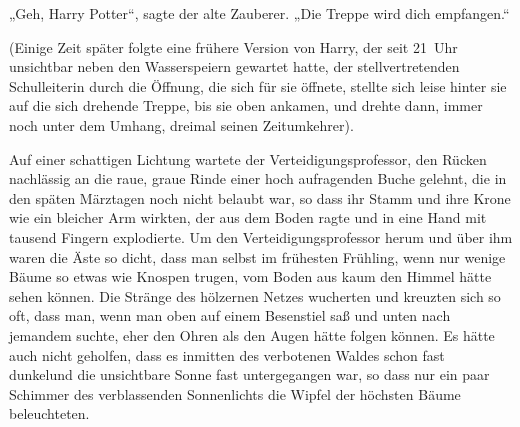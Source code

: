 „Geh, Harry Potter“, sagte der alte Zauberer. „Die Treppe wird dich empfangen.“

(Einige Zeit später folgte eine frühere Version von Harry, der seit 21~Uhr unsichtbar neben den Wasserspeiern gewartet hatte, der stellvertretenden Schulleiterin durch die Öffnung, die sich für sie öffnete, stellte sich leise hinter sie auf die sich drehende Treppe, bis sie oben ankamen, und drehte dann, immer noch unter dem Umhang, dreimal seinen Zeitumkehrer).


Auf einer schattigen Lichtung wartete der Verteidigungsprofessor, den Rücken nachlässig an die raue, graue Rinde einer hoch aufragenden Buche gelehnt, die in den späten Märztagen noch nicht belaubt war, so dass ihr Stamm und ihre Krone wie ein bleicher Arm wirkten, der aus dem Boden ragte und in eine Hand mit tausend Fingern explodierte. Um den Verteidigungsprofessor herum und über ihm waren die Äste so dicht, dass man selbst im frühesten Frühling, wenn nur wenige Bäume so etwas wie Knospen trugen, vom Boden aus kaum den Himmel hätte sehen können. Die Stränge des hölzernen Netzes wucherten und kreuzten sich so oft, dass man, wenn man oben auf einem Besenstiel saß und unten nach jemandem suchte, eher den Ohren als den Augen hätte folgen können. Es hätte auch nicht geholfen, dass es inmitten des verbotenen Waldes schon fast dunkelund die unsichtbare Sonne fast untergegangen war, so dass nur ein paar Schimmer des verblassenden Sonnenlichts die Wipfel der höchsten Bäume beleuchteten.

